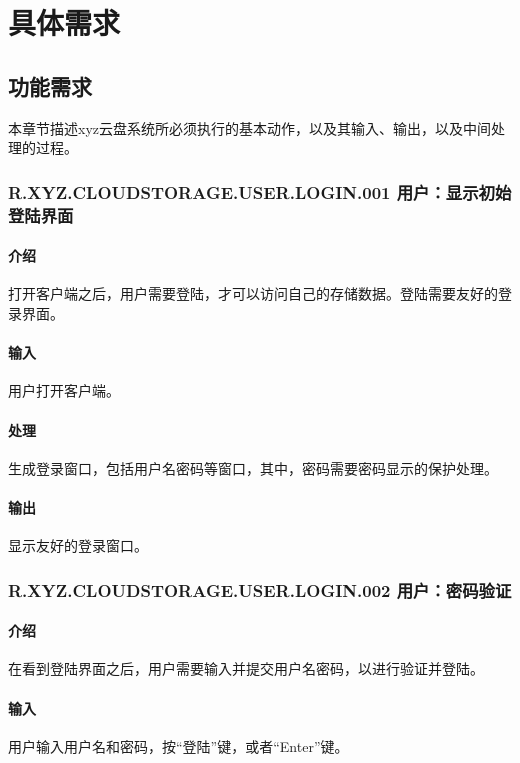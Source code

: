 \chapter{具体需求}
\section{功能需求}

本章节描述xyz云盘系统所必须执行的基本动作，以及其输入、输出，以及中间处理的过程。


\subsection{R.XYZ.CLOUDSTORAGE.USER.LOGIN.001 用户：显示初始登陆界面 }

\subsubsection{介绍}
打开客户端之后，用户需要登陆，才可以访问自己的存储数据。登陆需要友好的登录界面。

\subsubsection{输入}
用户打开客户端。

\subsubsection{处理}
生成登录窗口，包括用户名密码等窗口，其中，密码需要密码显示的保护处理。

\subsubsection{输出}
显示友好的登录窗口。

\subsection{R.XYZ.CLOUDSTORAGE.USER.LOGIN.002 用户：密码验证 }

\subsubsection{介绍}
在看到登陆界面之后，用户需要输入并提交用户名密码，以进行验证并登陆。

\subsubsection{输入}
用户输入用户名和密码，按“登陆”键，或者“Enter”键。


